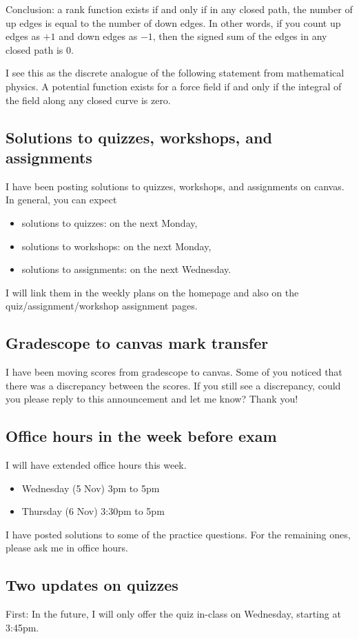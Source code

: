 \documentclass{amsart}
\begin{document}
Conclusion: a rank function exists if and only if in any closed path, the number of up edges is equal to the number of down edges.  In other words, if you count up edges as \(+1\) and down edges as \(-1\), then the signed sum of the edges in any closed path is \(0\). 

I see this as the discrete analogue of the following statement from mathematical physics.  A potential function exists for a force field if and only if the integral of the field along any closed curve is zero.
\subsection{Solutions to quizzes, workshops, and assignments}
\label{sec:orgf51f213}
I have been posting solutions to quizzes, workshops, and assignments on canvas.  In general, you can expect
\begin{itemize}
\item solutions to quizzes: on the next Monday,
\item solutions to workshops: on the next Monday,
\item solutions to assignments: on the next Wednesday.
\end{itemize}
I will link them in the weekly plans on the homepage and also on the quiz/assignment/workshop assignment pages.
\subsection{Gradescope to canvas mark transfer}
\label{sec:org4abdce4}
I have been moving scores from gradescope to canvas.  Some of you noticed that there was a discrepancy between the scores.  If you still see a discrepancy, could you please reply to this announcement and let me know?  Thank you!
\subsection{Office hours in the week before exam}
\label{sec:org72a5460}
I will have extended office hours this week.
\begin{itemize}
\item Wednesday (5 Nov) 3pm to 5pm
\item Thursday (6 Nov) 3:30pm to 5pm
\end{itemize}

I have posted solutions to some of the practice questions.  For the remaining ones, please ask me in office hours.
\subsection{Two updates on quizzes}
\label{sec:orgd2223cd}
First: In the future, I will only offer the quiz in-class on Wednesday, starting at 3:45pm.  
\end{document}
